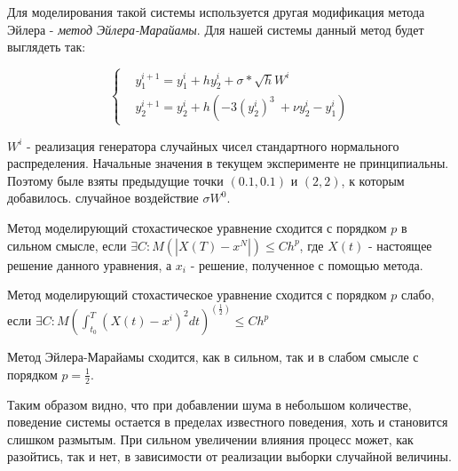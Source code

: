 Для моделирования такой системы используется другая
модификация метода Эйлера - \textit{метод Эйлера-Марайамы}.
Для нашей системы данный метод будет выглядеть так:

\begin{equation}\label{lab9:eq:method}
\begin{cases}
    &y_1^{i+1} = y_1^i + h y_2^i + \sigma * \sqrt{h} W^i\\
    &y_2^{i+1} = y_2^i + h (-3(y_2^i)^3\ + \nu y_2^i - y_1^i)
\end{cases}
\end{equation}

$W^i$ - реализация генератора случайных чисел стандартного
нормального распределения. Начальные значения в текущем
эксперименте не принципиальны. Поэтому быле взяты предыдущие
точки $(0.1,0.1)$ и $(2,2)$, к которым добавилось.
случайное воздействие $\sigma W^0$.

\begin{definition}
    Метод моделирующий стохастическое уравнение сходится с
    порядком $p$ в сильном смысле, если
    $\exists C : M(|X(T) - x^N|) \leq Ch^p$, где $X(t)$ - настоящее решение
    данного уравнения, а ${x}_i$ - решение, полученное с помощью метода.
\end{definition}

\begin{definition}
    Метод моделирующий стохастическое уравнение сходится с
    порядком $p$ слабо, если
    $\exists C : M(\int_{t_0}^T(X(t) - x^i)^2dt)^(\frac{1}{2}) \leq Ch^p$
\end{definition}

\begin{theorem}
    Метод Эйлера-Марайамы сходится, как в сильном, так и в слабом
    смысле с порядком $p = \frac{1}{2}$.
\end{theorem}


\clearpage
Таким образом видно, что при добавлении шума в небольшом количестве,
поведение системы остается в пределах известного поведения, хоть
и становится слишком размытым. При сильном увеличении влияния
процесс может, как разойтись, так и нет, в зависимости от
реализации выборки случайной величины.

